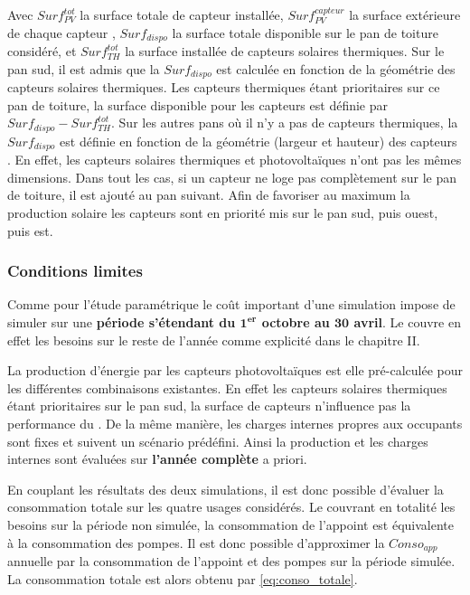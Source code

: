 Avec $Surf_{PV}^{tot}$ la surface totale de capteur  installée,
$Surf_{PV}^{capteur}$ la surface extérieure de chaque capteur , $Surf_{dispo}$ la
surface totale disponible sur le pan de toiture considéré, et $Surf_{TH}^{tot}$ la surface
installée de capteurs solaires thermiques. Sur le pan sud, il est admis que
la $Surf_{dispo}$ est calculée en fonction de la géométrie des capteurs solaires
thermiques. Les capteurs thermiques étant prioritaires sur ce pan de toiture, la surface
disponible pour les capteurs  est définie par $Surf_{dispo} - Surf_{TH}^{tot}$.
Sur les autres pans où il n’y a pas de capteurs thermiques, la $Surf_{dispo}$ est
définie en fonction de la géométrie (largeur et hauteur) des capteurs . En effet,
les capteurs solaires thermiques et photovoltaïques n’ont pas les mêmes dimensions.
Dans tout les cas, si un capteur ne loge pas complètement sur le pan de toiture,
il est ajouté au pan suivant. Afin de favoriser au maximum la production solaire
les capteurs sont en priorité mis sur le pan sud, puis ouest, puis est.


\subsubsection{Conditions limites} %
\label{ssub:conditions_limites}
Comme pour l’étude paramétrique le coût important d’une simulation impose de simuler
sur une \textbf{période s’étendant du $\bm{1^{er}}$ octobre au $\bm{30}$ avril}. Le 
couvre en effet les besoins sur le reste de l’année comme explicité dans le chapitre II.

La production d’énergie par les capteurs photovoltaïques est elle pré-calculée pour
les différentes combinaisons existantes. En effet les capteurs solaires thermiques
étant prioritaires sur le pan sud, la surface de capteurs  n’influence
pas la performance du . De la même manière, les charges internes propres
aux occupants sont fixes et suivent un scénario prédéfini. Ainsi la production
 et les charges internes sont évaluées sur \textbf{l’année complète}
a priori.

En couplant les résultats des deux simulations, il est donc possible d’évaluer la
consommation totale sur les quatre usages considérés. Le  couvrant en totalité
les besoins sur la période non simulée, la consommation de l’appoint est équivalente à la
consommation des pompes. Il est donc possible d’approximer la $Conso_{app}$ annuelle par
la consommation de l’appoint et des pompes sur la période simulée. La consommation totale
est alors obtenu par \eqref{eq:conso_totale}.

